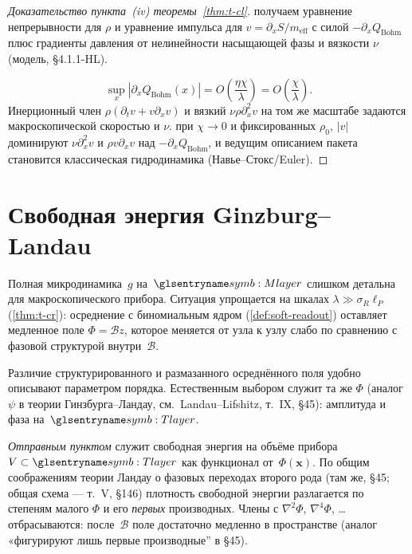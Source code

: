 \begin{proof}[Доказательство пункта~\emph{(iv)} теоремы~\ref{thm:t-cl}]
получаем уравнение непрерывности для $\rho$ и уравнение импульса для $v=\partial_x S/m_{\mathrm{eff}}$
с силой $-\partial_x Q_{\mathrm{Bohm}}$ плюс градиенты давления от нелинейности насыщающей фазы и вязкости $\nu$
(модель, \S4.1.1-HL).

\[
  \sup_x|\partial_x Q_{\mathrm{Bohm}}(x)|=O\!\left(\frac{\eta\chi}{\lambda}\right)=O\!\left(\frac{\chi}{\lambda}\right).
\]
Инерционный член $\rho(\partial_t v+v\partial_x v)$ и вязкий $\nu\rho\partial_x^2 v$ на том же масштабе
задаются макроскопической скоростью и $\nu$.
\phence при $\chi\to 0$ и фиксированных $\rho_0$, $|v|$ доминируют $\nu\partial_x^2 v$ и $\rho v\partial_x v$
над $-\partial_x Q_{\mathrm{Bohm}}$, и ведущим описанием пакета становится классическая гидродинамика (Навье--Стокс/Euler).
\end{proof}

\section{Свободная энергия Ginzburg--Landau}
\label{sec:gl-free-energy}

Полная микродинамика~$g$ на~$\Mlayer$ слишком детальна для макроскопического прибора.
Ситуация упрощается на шкалах $\lambda\gg\sigma_R\ell_P$ (\cref{thm:t-cr}): осреднение с биномиальным ядром (\cref{def:soft-readout})
оставляет медленное поле $\Phi=\mathcal{B}z$, которое меняется от узла к узлу слабо по сравнению
с фазовой структурой внутри~$\mathcal{B}$.

Различие структурированного и размазанного осреднённого поля удобно описывают параметром порядка.
Естественным выбором служит та же $\Phi$ (аналог $\psi$ в теории Гинзбурга--Ландау, см.~Landau--Lifshitz, т.~IX, \S45):
амплитуда и фаза на~$\Tlayer$.

\emph{Отправным пунктом} служит свободная энергия на объёме прибора~$V\subset\Tlayer$
как функционал от~$\Phi(\mathbf{x})$.
По общим соображениям теории Ландау о фазовых переходах второго рода
(там же, \S45; общая схема --- т.~V, \S146) плотность свободной энергии разлагается
по степеням малого $\Phi$ и его \emph{первых} производных.
Члены с $\nabla^2\Phi$, $\nabla^4\Phi$, \ldots{} отбрасываются: после~$\mathcal{B}$ поле достаточно
медленно в пространстве (аналог «фигурируют лишь первые производные'' в \S45).


